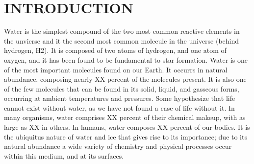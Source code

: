 \chapter{INTRODUCTION}
%
%
%
%
%
%




Water is the simplest compound of the two most common reactive
elements in the unvierse and it the second most common molecule in the
universe (behind hydrogen, H2). It is composed of two atoms of
hydrogen, and one atom of oxygen, and it has been found to be
fundamental to star formation.  Water is one of the most important
molecules found on our Earth.  It occurrs in natural abundance,
composing nearly XX percent of the molecules present. It is also one
of the few molecules that can be found in its solid, liquid, and
gasseous forms, occurring at ambient temperatures and pressures.  Some
hypothesize that life cannot exist without water, as we have not found
a case of life without it. In many organisms, water comprises XX
percent of their chemical makeup, with as large as XX in others. In
humans, water composes XX percent of our bodies. It is the ubiquitus
nature of water and ice that gives rise to its importance; due to its
natural abundance a wide variety of chemistry and physical processes
occur within this medium, and at its surfaces.

